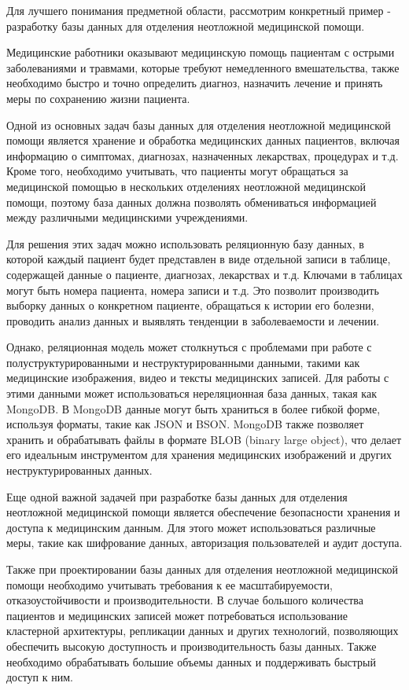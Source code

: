 Для лучшего понимания предметной области, рассмотрим конкретный пример - разработку базы данных для отделения неотложной медицинской помощи.

Медицинские работники оказывают медицинскую помощь пациентам с острыми заболеваниями и травмами, которые требуют немедленного вмешательства, также необходимо быстро и точно определить диагноз, назначить лечение и принять меры по сохранению жизни пациента.

Одной из основных задач базы данных для отделения неотложной медицинской помощи является хранение и обработка медицинских данных пациентов, включая информацию о симптомах, диагнозах, назначенных лекарствах, процедурах и т.д. Кроме того, необходимо учитывать, что пациенты могут обращаться за медицинской помощью в нескольких отделениях неотложной медицинской помощи, поэтому база данных должна позволять обмениваться информацией между различными медицинскими учреждениями.

Для решения этих задач можно использовать реляционную базу данных, в которой каждый пациент будет представлен в виде отдельной записи в таблице, содержащей данные о пациенте, диагнозах, лекарствах и т.д. Ключами в таблицах могут быть номера пациента, номера записи и т.д. Это позволит производить выборку данных о конкретном пациенте, обращаться к истории его болезни, проводить анализ данных и выявлять тенденции в заболеваемости и лечении.

Однако, реляционная модель может столкнуться с проблемами при работе с полуструктурированными и неструктурированными данными, такими как медицинские изображения, видео и тексты медицинских записей. Для работы с этими данными может использоваться нереляционная база данных, такая как MongoDB. В MongoDB данные могут быть храниться в более гибкой форме, используя форматы, такие как JSON и BSON. MongoDB также позволяет хранить и обрабатывать файлы в формате BLOB (binary large object), что делает его идеальным инструментом для хранения медицинских изображений и других неструктурированных данных.

Еще одной важной задачей при разработке базы данных для отделения неотложной медицинской помощи является обеспечение безопасности хранения и доступа к медицинским данным. Для этого может использоваться различные меры, такие как шифрование данных, авторизация пользователей и аудит доступа.

Также при проектировании базы данных для отделения неотложной медицинской помощи необходимо учитывать требования к ее масштабируемости, отказоустойчивости и производительности. В случае большого количества пациентов и медицинских записей может потребоваться использование кластерной архитектуры, репликации данных и других технологий, позволяющих обеспечить высокую доступность и производительность базы данных. Также необходимо обрабатывать большие объемы данных и поддерживать быстрый доступ к ним.

